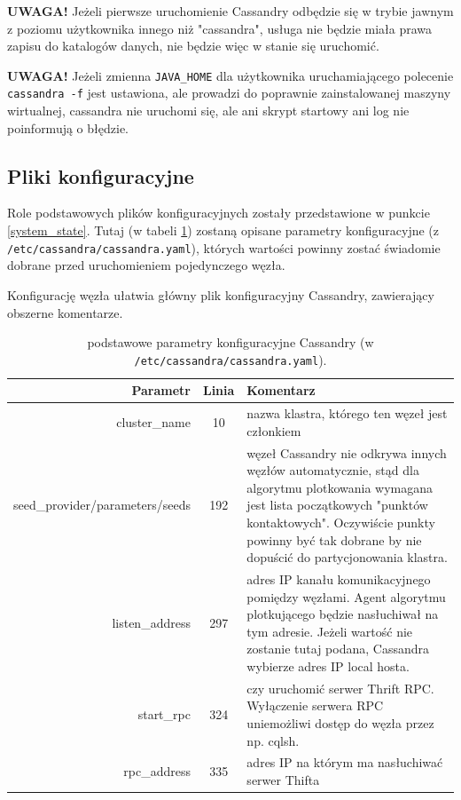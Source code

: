 \documentclass{article}
\begin{document}
\textbf{UWAGA!} Jeżeli pierwsze uruchomienie Cassandry odbędzie się w trybie jawnym z poziomu użytkownika innego niż "cassandra", usługa nie będzie miała prawa zapisu do katalogów danych, nie będzie więc w stanie się uruchomić.

\textbf{UWAGA!} Jeżeli zmienna \lstinline[style=bash]!JAVA_HOME! dla użytkownika uruchamiającego polecenie \lstinline[style=bash]!cassandra -f! jest ustawiona, ale prowadzi do poprawnie zainstalowanej maszyny wirtualnej, cassandra nie uruchomi się, ale ani skrypt startowy ani log nie poinformują o błędzie.

\pagebreak

\subsection{Pliki konfiguracyjne}

Role podstawowych plików konfiguracyjnych zostały przedstawione w punkcie \ref{system_state}. Tutaj (w tabeli \ref{config_table}) zostaną opisane parametry konfiguracyjne (z \lstinline[style=bash]!/etc/cassandra/cassandra.yaml!), których wartości powinny zostać świadomie dobrane przed uruchomieniem pojedynczego węzła.

Konfigurację węzła ułatwia główny plik konfiguracyjny Cassandry, zawierający obszerne komentarze.

\begin{table}[hhh]
\caption{podstawowe parametry konfiguracyjne Cassandry (w \lstinline[style=bash]!/etc/cassandra/cassandra.yaml!).}
\label{config_table}
\begin{tabular}{|r|c|p{8cm}|}
\hline 
\textbf{Parametr} & \textbf{Linia} & \textbf{Komentarz}\\
\hline
\hline
cluster\_name & 10 & nazwa klastra, którego ten węzeł jest członkiem\\
\hline
seed\_provider/parameters/seeds & 192 & węzeł Cassandry nie odkrywa innych węzłów automatycznie, stąd dla algorytmu plotkowania wymagana jest lista początkowych "punktów kontaktowych". Oczywiście punkty powinny być tak dobrane by nie dopuścić do partycjonowania klastra.\\
\hline
listen\_address & 297 & adres IP kanału komunikacyjnego pomiędzy węzłami. Agent algorytmu plotkującego będzie nasłuchiwał na tym adresie. Jeżeli wartość nie zostanie tutaj podana, Cassandra wybierze adres IP local hosta.\\
\hline
start\_rpc & 324 & czy uruchomić serwer Thrift RPC. Wyłączenie serwera RPC uniemożliwi dostęp do węzła przez np. cqlsh.\\
\hline
rpc\_address & 335 & adres IP na którym ma nasłuchiwać serwer Thifta\\
\hline
\end{tabular} 
\end{table}
\end{document}
